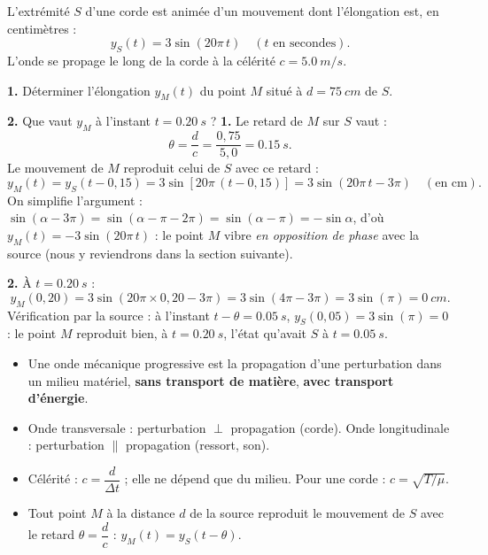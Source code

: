\documentclass[11pt]{article}
\newcommand{\cle}[1]{{\popxbold\color{popdark}#1}}
\begin{document}
\begin{exoresolu}
L'extrémité $S$ d'une corde est animée d'un mouvement dont l'élongation est, en centimètres :
\[ y_S(t) = 3\sin\left(20\pi\, t\right) \quad (t \text{ en secondes}). \]
L'onde se propage le long de la corde à la célérité $c = \SI{5,0}{m/s}$.

\textbf{1.} Déterminer l'élongation $y_M(t)$ du point $M$ situé à $d = \SI{75}{cm}$ de $S$.

\textbf{2.} Que vaut $y_M$ à l'instant $t = \SI{0,20}{s}$ ?
\tcblower
\textbf{1.} Le retard de $M$ sur $S$ vaut :
\[ \theta = \dfrac{d}{c} = \dfrac{0{,}75}{5{,}0} = \SI{0,15}{s}. \]
Le mouvement de $M$ reproduit celui de $S$ avec ce retard :
\[ y_M(t) = y_S(t - 0{,}15) = 3\sin\left[20\pi\,(t - 0{,}15)\right] = 3\sin\left(20\pi\, t - 3\pi\right) \quad (\text{en cm}). \]
On simplifie l'argument : $\sin(\alpha - 3\pi) = \sin(\alpha - \pi - 2\pi) = \sin(\alpha - \pi) = -\sin\alpha$, d'où $y_M(t) = -3\sin(20\pi\, t)$ : le point $M$ vibre \emph{en opposition de phase} avec la source (nous y reviendrons dans la section suivante).

\textbf{2.} À $t = \SI{0,20}{s}$ :
\[ y_M(0{,}20) = 3\sin(20\pi \times 0{,}20 - 3\pi) = 3\sin(4\pi - 3\pi) = 3\sin(\pi) = \SI{0}{cm}. \]
Vérification par la source : à l'instant $t - \theta = \SI{0,05}{s}$, $y_S(0{,}05) = 3\sin(\pi) = 0$ : le point $M$ reproduit bien, à $t = \SI{0,20}{s}$, l'état qu'avait $S$ à $t = \SI{0,05}{s}$.
\end{exoresolu}

\begin{aretenir}
\begin{itemize}
\item Une \cle{onde mécanique progressive} est la propagation d'une perturbation dans un milieu matériel, \textbf{sans transport de matière}, \textbf{avec transport d'énergie}.
\item Onde \cle{transversale} : perturbation $\perp$ propagation (corde). Onde \cle{longitudinale} : perturbation $\parallel$ propagation (ressort, son).
\item Célérité : $c = \dfrac{d}{\Delta t}$ ; elle ne dépend que du milieu. Pour une corde : $c = \sqrt{T/\mu}$.
\item Tout point $M$ à la distance $d$ de la source reproduit le mouvement de $S$ avec le retard $\theta = \dfrac{d}{c}$ : $y_M(t) = y_S(t - \theta)$.
\end{itemize}
\end{aretenir}
\end{document}
